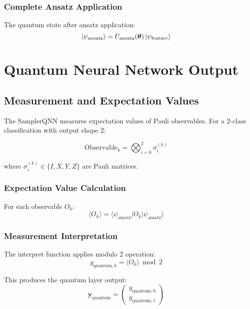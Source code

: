 \documentclass[12pt]{article}
\begin{document}
\subsubsection{Complete Ansatz Application}
The quantum state after ansatz application:
\begin{equation}
\ket{\psi_{\text{ansatz}}} = U_{\text{ansatz}}(\boldsymbol{\theta}) \ket{\psi_{\text{feature}}}
\end{equation}

\section{Quantum Neural Network Output}

\subsection{Measurement and Expectation Values}
The SamplerQNN measures expectation values of Pauli observables. For a 2-class classification with output shape 2:

\begin{equation}
\text{Observable}_k = \bigotimes_{i=0}^{2} \sigma_i^{(k)}
\end{equation}

where $\sigma_i^{(k)} \in \{I, X, Y, Z\}$ are Pauli matrices.

\subsubsection{Expectation Value Calculation}
For each observable $O_k$:
\begin{equation}
\langle O_k \rangle = \langle \psi_{\text{ansatz}} | O_k | \psi_{\text{ansatz}} \rangle
\end{equation}

\subsubsection{Measurement Interpretation}
The interpret function applies modulo 2 operation:
\begin{equation}
y_{\text{quantum},k} = \langle O_k \rangle \bmod 2
\end{equation}

This produces the quantum layer output:
\begin{equation}
\mathbf{y}_{\text{quantum}} = \begin{pmatrix} y_{\text{quantum},0} \\ y_{\text{quantum},1} \end{pmatrix}
\end{equation}
\end{document}
